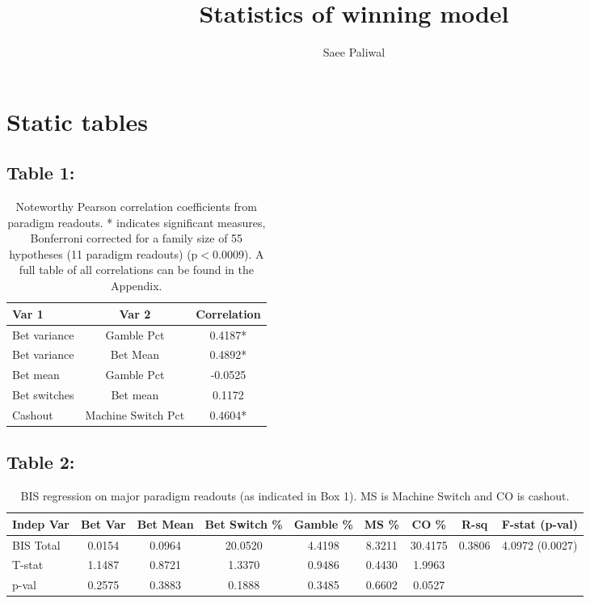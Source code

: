 \documentclass[10pt]{article}
\title{Statistics of winning model}
\author{Saee Paliwal}
\numberwithin{equation}{subsection}
\begin{document}
\maketitle
\section{Static tables}
\subsection{Table 1:}
\begin{table}[htb!]
\begin{center}
  \begin{tabular}[htb!]{l|c|c}
    Var 1 & Var 2 & Correlation\\
    \hline\hline
    Bet variance & Gamble Pct & 0.4187*\\
    Bet variance & Bet Mean & 0.4892*\\
    Bet mean & Gamble Pct & -0.0525\\
    Bet switches & Bet mean & 0.1172\\
    Cashout & Machine Switch Pct & 0.4604*\\
  \end{tabular}
  \caption{Noteworthy Pearson correlation coefficients from paradigm readouts. * indicates significant measures, Bonferroni corrected for a family size of 55 hypotheses (11 paradigm readouts) (p$<$0.0009). A full table of all correlations can be found in the Appendix.}
\label{tab:paradigm stats}
\end{center}
\end{table}

\subsection{Table 2:}

\begin{table}[htb!]
\begin{center}
  \begin{tabular}{l|c|c|c|c|c|c|c|c}
    Indep Var & Bet Var & Bet Mean & Bet Switch \% & Gamble \% & MS \% & CO \% &  R-sq & F-stat (p-val)\\
    \hline
    BIS Total & 0.0154 & 0.0964 & 20.0520 & 4.4198 & 8.3211 & 30.4175 & 0.3806 & 4.0972 (0.0027)\\
    \scriptsize{T-stat} & \scriptsize{ 1.1487} &   \scriptsize{0.8721} & \scriptsize{1.3370} & \scriptsize{0.9486} & \scriptsize{ 0.4430} & \scriptsize{1.9963} & &\\
    \scriptsize{p-val} & \scriptsize{0.2575} & \scriptsize{0.3883} & \scriptsize{0.1888} & \scriptsize{0.3485} & \scriptsize{0.6602} & \scriptsize{0.0527} & \\
    \end{tabular}
    \caption{BIS regression on major paradigm readouts (as indicated in Box 1). MS is Machine Switch and CO is cashout.}
    \label{tab:BISreg1}
    \end{center}
\end{table}
\pagebreak
\end{document}
